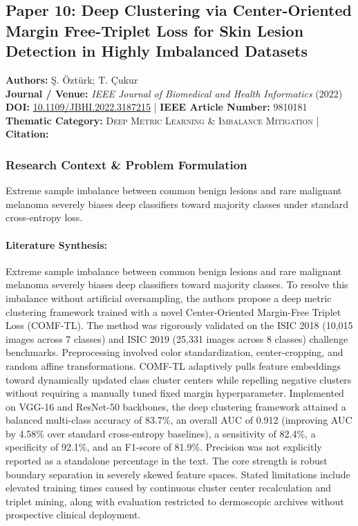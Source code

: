 \subsection{Paper 10: Deep Clustering via Center-Oriented Margin Free-Triplet Loss for Skin Lesion Detection in Highly Imbalanced Datasets}
\label{sec:paper_10}

\begin{tcolorbox}[colback=gray!5!white,colframe=gray!75!black,title=\textbf{Metadata \& Citation Summary}]
\textbf{Authors:} Ş. Öztürk; T. Çukur \\
\textbf{Journal / Venue:} \textit{IEEE Journal of Biomedical and Health Informatics} (2022) \\
\textbf{DOI:} \href{https://doi.org/10.1109/JBHI.2022.3187215}{10.1109/JBHI.2022.3187215} \quad | \quad \textbf{IEEE Article Number:} 9810181 \\
\textbf{Thematic Category:} \textsc{Deep Metric Learning \& Imbalance Mitigation} \quad | \quad \textbf{Citation:} \cite{9810181}
\end{tcolorbox}

\subsubsection*{Research Context \& Problem Formulation}
Extreme sample imbalance between common benign lesions and rare malignant melanoma severely biases deep classifiers toward majority classes under standard cross-entropy loss.

\paragraph{Literature Synthesis:} Extreme sample imbalance between common benign lesions and rare malignant melanoma severely biases deep classifiers toward majority classes. To resolve this imbalance without artificial oversampling, the authors propose a deep metric clustering framework trained with a novel Center-Oriented Margin-Free Triplet Loss (COMF-TL). The method was rigorously validated on the ISIC 2018 (10,015 images across 7 classes) and ISIC 2019 (25,331 images across 8 classes) challenge benchmarks. Preprocessing involved color standardization, center-cropping, and random affine transformations. COMF-TL adaptively pulls feature embeddings toward dynamically updated class cluster centers while repelling negative clusters without requiring a manually tuned fixed margin hyperparameter. Implemented on VGG-16 and ResNet-50 backbones, the deep clustering framework attained a balanced multi-class accuracy of 83.7\%, an overall AUC of 0.912 (improving AUC by 4.58\% over standard cross-entropy baselines), a sensitivity of 82.4\%, a specificity of 92.1\%, and an F1-score of 81.9\%. Precision was not explicitly reported as a standalone percentage in the text. The core strength is robust boundary separation in severely skewed feature spaces. Stated limitations include elevated training times caused by continuous cluster center recalculation and triplet mining, along with evaluation restricted to dermoscopic archives without prospective clinical deployment.

